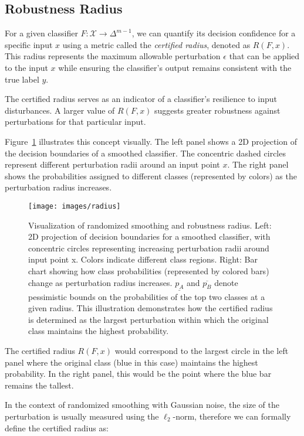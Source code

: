 \subsection{Robustness Radius}\label{subsec:robustness-radius}

For a given classifier $F: \mathcal{X} \rightarrow \Delta^{m-1}$, we can quantify its decision confidence for a specific input $x$ using a metric called the \textit{certified radius}, denoted as $R(F,x)$.
This radius represents the maximum allowable perturbation $\epsilon$ that can be applied to the input $x$ while ensuring the classifier's output remains consistent with the true label $y$.

The certified radius serves as an indicator of a classifier's resilience to input disturbances.
A larger value of $R(F,x)$ suggests greater robustness against perturbations for that particular input.

Figure~\ref{fig:radius} illustrates this concept visually.
The left panel shows a 2D projection of the decision boundaries of a smoothed classifier.
The concentric dashed circles represent different perturbation radii around an input point $x$.
The right panel shows the probabilities assigned to different classes (represented by colors) as the perturbation radius increases.
\begin{figure}[htbp]
    \centering
    \texttt{[image: images/radius]}
    \caption{Visualization of randomized smoothing and robustness radius. Left: 2D projection of decision boundaries for a smoothed classifier, with concentric circles representing increasing perturbation radii around input point x. Colors indicate different class regions. Right: Bar chart showing how class probabilities (represented by colored bars) change as perturbation radius increases. $\underline{p_A}$ and $\overline{p_B}$ denote pessimistic bounds on the probabilities of the top two classes at a given radius. This illustration demonstrates how the certified radius is determined as the largest perturbation within which the original class maintains the highest probability.}
    \label{fig:radius}
\end{figure}

The certified radius $R(F,x)$ would correspond to the largest circle in the left panel where the original class (blue in this case) maintains the highest probability.
In the right panel, this would be the point where the blue bar remains the tallest.

In the context of randomized smoothing with Gaussian noise, the size of the perturbation is usually measured using the $\ell_2$-norm, therefore we can formally define the certified radius as:

